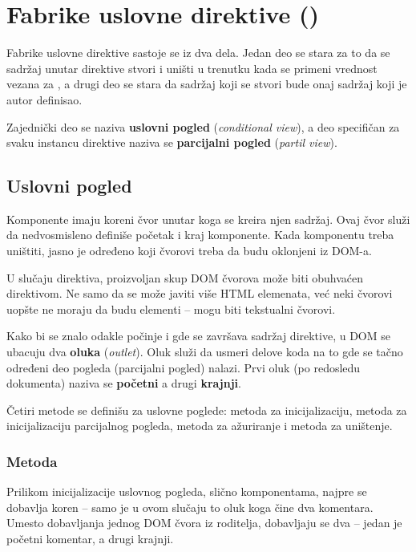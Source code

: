 \section{Fabrike uslovne direktive ()}\label{sec:fabrike-uslovne-direktive}

Fabrike uslovne direktive sastoje se iz dva dela.
Jedan deo se stara za to da se sadržaj unutar direktive stvori i uništi u trenutku kada se primeni vrednost vezana za , a drugi deo se stara da sadržaj koji se stvori bude onaj sadržaj koji je autor definisao.

Zajednički deo se naziva \textbf{uslovni pogled} (\textsl{conditional view}), a deo specifičan za svaku instancu direktive naziva se \textbf{parcijalni pogled} (\textsl{partil view}).

\subsection{Uslovni pogled}

Komponente imaju koreni čvor unutar koga se kreira njen sadržaj.
Ovaj čvor služi da nedvosmisleno definiše početak i kraj komponente.
Kada komponentu treba uništiti, jasno je određeno koji čvorovi treba da budu oklonjeni iz DOM-a.

U slučaju direktiva, proizvoljan skup DOM čvorova može biti obuhvaćen direktivom.
Ne samo da se može javiti više HTML elemenata, već neki čvorovi uopšte ne moraju da budu elementi -- mogu biti tekstualni čvorovi.

Kako bi se znalo odakle počinje i gde se završava sadržaj direktive, u DOM se ubacuju dva \textbf{oluka} (\textsl{outlet}).
Oluk služi da usmeri delove koda na to gde se tačno određeni deo pogleda (parcijalni pogled) nalazi.
Prvi oluk (po redosledu dokumenta) naziva se \textbf{početni} a drugi \textbf{krajnji}.

Četiri metode se definišu za uslovne poglede: metoda za inicijalizaciju, metoda za inicijalizaciju parcijalnog pogleda, metoda za ažuriranje i metoda za uništenje.

\subsubsection{Metoda }

Prilikom inicijalizacije uslovnog pogleda, slično komponentama, najpre se dobavlja koren -- samo je u ovom slučaju to oluk koga čine dva komentara.
Umesto dobavljanja jednog DOM čvora iz roditelja, dobavljaju se dva -- jedan je početni komentar, a drugi krajnji.


